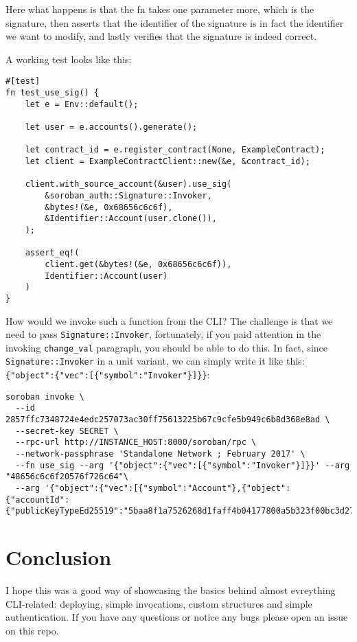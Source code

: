Here what happens is that the fn takes one parameter more, which is the signature, then asserts that the identifier of the signature is in fact the identifier we want to modify, and lastly verifies that the signature is indeed correct.

A working test looks like this:

\begin{lstlisting}
#[test]
fn test_use_sig() {
    let e = Env::default();

    let user = e.accounts().generate();

    let contract_id = e.register_contract(None, ExampleContract);
    let client = ExampleContractClient::new(&e, &contract_id);

    client.with_source_account(&user).use_sig(
        &soroban_auth::Signature::Invoker,
        &bytes!(&e, 0x68656c6c6f),
        &Identifier::Account(user.clone()),
    );

    assert_eq!(
        client.get(&bytes!(&e, 0x68656c6c6f)),
        Identifier::Account(user)
    )
}
\end{lstlisting}

How would we invoke such a function from the CLI? The challenge is that we need to pass \texttt{Signature::Invoker}, fortunately, if you paid attention in the invoking \texttt{change\_val} paragraph, you should be able to do this. In fact, since \texttt{Signature::Invoker} in a unit variant, we can simply write it like this: \texttt{\{"object":\{"vec":{[}\{"symbol":"Invoker"\}{]}\}\}}:

\begin{lstlisting}
soroban invoke \
  --id 2857ffc7348724e4edc257073ac30ff75613225b67c9cfe5b949c6b8d368e8ad \
  --secret-key SECRET \
  --rpc-url http://INSTANCE_HOST:8000/soroban/rpc \
  --network-passphrase 'Standalone Network ; February 2017' \
  --fn use_sig --arg '{"object":{"vec":[{"symbol":"Invoker"}]}}' --arg "48656c6c6f20576f726c64"\
  --arg '{"object":{"vec":[{"symbol":"Account"},{"object":{"accountId":{"publicKeyTypeEd25519":"5baa8f1a7526268d1faff4b04177800a5b323f00bc3d27fb6c33833e10d0518d"}}}]}}'
\end{lstlisting}

\section{Conclusion}\label{conclusion}

I hope this was a good way of showcasing the basics behind almost evreything CLI-related: deploying, simple invocations, custom structures and simple authentication. If you have any questions or notice any bugs please open an issue on this repo.


